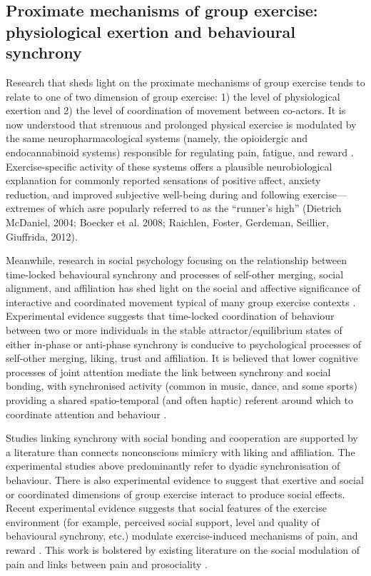 \subsection{Proximate mechanisms of group exercise: physiological exertion and behavioural synchrony}
Research that sheds light on the proximate mechanisms of group exercise tends to relate to one of two dimension of group exercise: 1) the level of physiological exertion and 2) the level of coordination of movement between co-actors.  It is now understood that strenuous and prolonged physical exercise is modulated by the same neuropharmacological systems (namely, the opioidergic and endocannabinoid systems) responsible for regulating pain, fatigue, and reward \citep{Boecker2008,Raichlen2013}.  Exercise-specific activity of these systems offers a plausible neurobiological explanation for commonly reported sensations of positive affect, anxiety reduction, and improved subjective well-being during and following exercise---extremes of which asre popularly referred to as the ``runner's high'' (Dietrich  McDaniel, 2004; Boecker et al. 2008; Raichlen, Foster, Gerdeman, Seillier,  Giuffrida, 2012).

Meanwhile, research in social psychology focusing on the relationship between time-locked behavioural synchrony and processes of self-other merging, social alignment, and affiliation has shed light on the social and affective significance of interactive and coordinated movement typical of many group exercise contexts \cite{Wiltermuth2009,Kirschner2010,Reddish2013,Tuncgenc2016}. Experimental evidence suggests that time-locked coordination of behaviour between two or more individuals in the stable attractor/equilibrium states of either in-phase or anti-phase synchrony is conducive to psychological processes of self-other merging, liking, trust and affiliation.  It is believed that lower cognitive processes of joint attention mediate the link between synchrony and social bonding, with synchronised activity (common in music, dance, and some sports) providing a shared spatio-temporal (and often haptic) referent around which to coordinate attention and behaviour \cite{Launay2016,Wolf2015}.

Studies linking synchrony with social bonding and cooperation are supported by a literature than connects nonconscious mimicry with liking and affiliation\citep{VanBaaren2009}.  The experimental studies above predominantly refer to dyadic synchronisation of behaviour.   There is also experimental evidence to suggest that exertive and social or coordinated dimensions of group exercise interact to produce social effects.  Recent experimental evidence suggests that social features of the exercise environment (for example, perceived social support, level and quality of behavioural synchrony, etc.) modulate exercise-induced mechanisms of pain, and reward \citep{Cohen2009,Sullivan2014,Tarr2015,Davis2015,Weinstein2016}. This work is bolstered by existing literature on the social modulation of pain \citep{Eisenberger2012a} and links between pain and prosociality \citep{Bastian2014a}.

